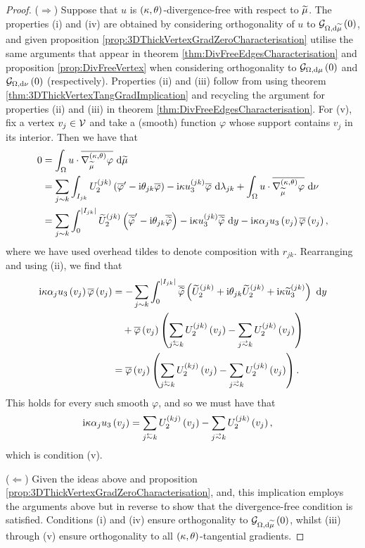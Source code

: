 \begin{proof}
	($\Rightarrow$) Suppose that $u$ is $\left( \kappa, \theta \right)$-divergence-free with respect to $\widetilde{\mu}$.
	The properties (i) and (iv) are obtained by considering orthogonality of $u$ to $\mathcal{G}_{ \Omega, \mathrm{d}\widetilde{\mu}}\left( 0 \right)$, and given proposition \ref{prop:3DThickVertexGradZeroCharacterisation} utilise the same arguments that appear in theorem \ref{thm:DivFreeEdgesCharacterisation} and proposition \ref{prop:DivFreeVertex} when considering orthogonality to $\mathcal{G}_{ \Omega, \mathrm{d}\mu}\left( 0 \right)$ and $\mathcal{G}_{ \Omega, \mathrm{d}\nu}\left( 0 \right)$ (respectively).
	Properties (ii) and (iii) follow from using theorem \ref{thm:3DThickVertexTangGradImplication} and recycling the argument for properties (ii) and (iii) in theorem \ref{thm:DivFreeEdgesCharacterisation}.
	For (v), fix a vertex $v_j\in\mathcal{V}$ and take a (smooth) function $\varphi$ whose support contains $v_j$ in its interior.
	Then we have that
	\begin{align*}
		0 &= \int_{\Omega} u\cdot\overline{\nabla^{\left( \kappa, \theta \right)}_{\widetilde{\mu}}\varphi}  \ \mathrm{d}\widetilde{\mu} \\
		&= \sum_{j\sim k}\int_{I_{jk}} U_2^{(jk)}\left( \overline{\varphi}' - \mathrm{i}\theta_{jk}\overline{\varphi} \right) - \mathrm{i}\kappa u_3^{(jk)}\overline{\varphi}  \ \mathrm{d}\lambda_{jk} + \int_{\Omega} u\cdot\overline{\nabla^{\left( \kappa, \theta \right)}_{\widetilde{\mu}}\varphi}  \ \mathrm{d}\nu \\
		&= \sum_{j\sim k}\int_0^{\left\lvert I_{jk} \right\rvert} \widetilde{U}_2^{(jk)}\left( \overline{\widetilde{\varphi}}' - \mathrm{i}\theta_{jk}\overline{\widetilde{\varphi}} \right) - \mathrm{i}\kappa u_3^{(jk)}\overline{\widetilde{\varphi}} \ \mathrm{d} y
		-\mathrm{i}\kappa\alpha_j u_3\left( v_j \right)\overline{\varphi}\left( v_j \right),
	\end{align*}
	where we have used overhead tildes to denote composition with $r_{jk}$.
	Rearranging and using (ii), we find that
	\begin{align*}
		\rmi\wavenumber\alpha_j u_3\bracs{v_j}\overline{\varphi}\bracs{v_j}
		&= - \sum_{j\con k}\int_0^{\abs{I_{jk}}} \overline{\widetilde{\varphi}}\bracs{ \widetilde{U}_2^{(jk)} + \rmi\qm_{jk}\widetilde{U}_2^{(jk)} + \rmi\wavenumber\widetilde{u}_3^{(jk)} } \ \md y \\
		&\quad + \overline{\varphi}\bracs{v_j}\bracs{ \sum_{j\conRight k} U_2^{(jk)}\bracs{v_j} - \sum_{j\conLeft k} U_2^{(jk)}\bracs{v_j} } \\
		&= \overline{\varphi}\bracs{v_j}\bracs{ \sum_{j\conRight k} U_2^{(kj)}\bracs{v_j} - \sum_{j\conLeft k} U_2^{(jk)}\bracs{v_j} }.
	\end{align*}
	This holds for every such smooth $\varphi$, and so we must have that
	\begin{align*}
		\rmi\wavenumber\alpha_j u_3\bracs{v_j} &= \sum_{j\conRight k} U_2^{(kj)}\bracs{v_j} - \sum_{j\conLeft k} U_2^{(jk)}\bracs{v_j},
	\end{align*}
	which is condition (v).
	
	($\Leftarrow$) Given the ideas above and proposition \ref{prop:3DThickVertexGradZeroCharacterisation}, and, this implication employs the arguments above but in reverse to show that the divergence-free condition is satisfied. 
	Conditions (i) and (iv) ensure orthogonality to $\mathcal{G}_{ \Omega, \mathrm{d}\widetilde{\mu}}\left( 0 \right)$, whilst (iii) through (v) ensure orthogonality to all $\left( \kappa, \theta \right)$-tangential gradients.
\end{proof}

